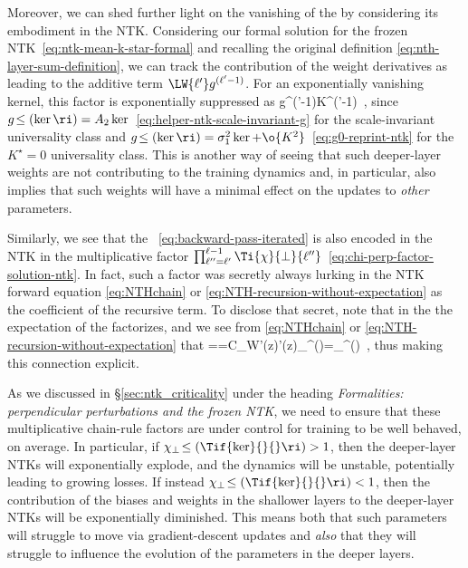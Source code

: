 Moreover, we can shed further light on the vanishing of the  by considering its embodiment in the NTK. Considering our formal solution for the frozen NTK~\eqref{eq:ntk-mean-k-star-formal} and recalling the original definition \eqref{eq:nth-layer-sum-definition}, we can track the contribution of the weight derivatives as leading to the additive term $\LW{\ell'}g^{(\ell'-1)}$. For an exponentially vanishing kernel, this factor is exponentially suppressed as
\be
{}g^{(\ell'-1)}\propto K^{(\ell'-1)}\, ,
\ee
since $g\!\le(\ker\ri)=A_2 \ker$~\eqref{eq:helper-ntk-scale-invariant-g} for the scale-invariant universality class and $g\!\le(\ker\ri)=\sigma_1^2 \ker+\o{K^2}$~\eqref{eq:g0-reprint-ntk} for the $K^\star=0$ universality class. This is another way of seeing that such deeper-layer weights are not contributing to the training dynamics and, in particular, also implies that such weights will have a minimal effect on the updates to \emph{other} parameters.



Similarly, we see that the ~\eqref{eq:backward-pass-iterated} is also encoded in the NTK in the multiplicative factor $\prod_{\ell''=\ell'}^{\ell-1}\Ti{\chi}{\perp}{\ell''}$~\eqref{eq:chi-perp-factor-solution-ntk}. In fact, such a factor was secretly always lurking in the NTK forward equation \eqref{eq:NTHchain} or \eqref{eq:NTH-recursion-without-expectation} as the coefficient of the recursive term.
To disclose that secret, note that in the  the expectation of the  factorizes, and we see from \eqref{eq:NTHchain} or \eqref{eq:NTH-recursion-without-expectation} that
\be
{}\!=\!=C_W\!\bra \sigma'(z)\sigma'(z)\ket_{\ker^{(\ell)}}=\chi_{\perp}^{(\ell)}\, ,
\ee
thus making this connection explicit.

As we discussed in \S\ref{sec:ntk_criticality} under the heading \emph{Formalities: perpendicular perturbations and the frozen NTK}, we need to ensure that these multiplicative chain-rule factors are under control for training to be well behaved, on average. In particular, if $\chi_{\perp}\!\le(\Tif{\ker}{}{}\ri)>1$, then the deeper-layer NTKs will exponentially explode, and the  dynamics will be unstable, potentially leading to growing losses. If instead $\chi_{\perp}\!\le(\Tif{\ker}{}{}\ri)<1$,
then the contribution of the biases and weights in the shallower layers to the deeper-layer NTKs will be exponentially diminished. This means both that such parameters will struggle to move via gradient-descent updates and \emph{also} that they will struggle to influence the evolution of the parameters in the deeper layers. 

